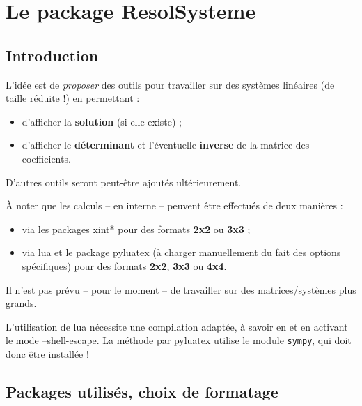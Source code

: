 \documentclass[a4paper,11pt]{article}
\begin{document}
\section{Le package ResolSysteme}

\subsection{Introduction}

\begin{noteblock}
L'idée est de \textit{proposer} des outils pour travailler sur des systèmes linéaires (de taille réduite !) en permettant :

\begin{itemize}
	\item d'afficher la \textbf{solution} (si elle existe) ;
	\item d'afficher le \textbf{déterminant} et l'éventuelle \textbf{inverse} de la matrice des coefficients.
\end{itemize}

D'autres outils seront peut-être ajoutés ultérieurement.
\end{noteblock}

\begin{importantblock}
À noter que les calculs -- en interne -- peuvent être effectués de deux manières :

\begin{itemize}
	\item via les packages \textsf{xint*} pour des formats \textbf{2x2} ou \textbf{3x3} ;
	\item via \textsf{lua} et le package \textsf{pyluatex} (à charger manuellement du fait des options spécifiques) pour des formats \textbf{2x2}, \textbf{3x3} ou \textbf{4x4}.
\end{itemize}

Il n'est pas prévu -- pour le moment -- de travailler sur des matrices/systèmes plus grands.
\end{importantblock}

\begin{warningblock}
L'utilisation de \textsf{lua} nécessite une compilation adaptée, à savoir en  et en activant le mode \textsf{--shell-escape}. La méthode par \textsf{pyluatex} utilise le module \texttt{sympy}, qui doit donc être installée !
\end{warningblock}

\subsection{Packages utilisés, choix de formatage}
\end{document}
